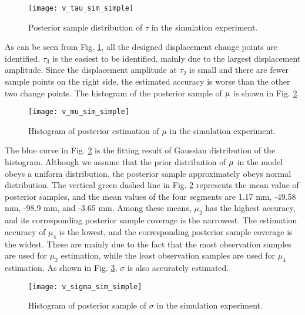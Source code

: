 \documentclass[final,3p,times]{elsarticle}
\begin{document}
	
	\begin{figure}[htbp]
		\centering
		\texttt{[image: v\_tau\_sim\_simple]}
		\caption{Posterior sample distribution of $\tau$ in the simulation experiment.}
		\label{fig_v_tau_sim_simple}
	\end{figure} 
	As can be seen from Fig. \ref{fig_v_tau_sim_simple}, all the designed displacement change points are identified. 
	$\tau_3$ is the easiest to be identified, mainly due to the largest displacement amplitude. 
	Since the displacement amplitude at $\tau_2$ is small and there are fewer sample points on the right side, the estimated accuracy is worse than the other two change points.
	The histogram of the posterior sample of $\bf{\mu}$ is shown in Fig. \ref{fig_v_mu_sim_simple}.
	
	\begin{figure}[htbp]
		\centering
		\texttt{[image: v\_mu\_sim\_simple]}
		\caption{Histogram of posterior estimation of $\mu$ in the simulation experiment.}
		\label{fig_v_mu_sim_simple}
	\end{figure} 
	The blue curve in Fig. \ref{fig_v_mu_sim_simple} is the fitting result of Gaussian distribution of the histogram.
	Although we assume that the prior distribution of $\bf{\mu}$ in the model obeys a uniform distribution, the posterior sample approximately obeys normal distribution. 
	The vertical green dashed line in Fig. \ref{fig_v_mu_sim_simple} represents the mean value of posterior samples, and the mean values of the four segments are 1.17 mm, -49.58 mm, -98.9 mm, and -3.65 mm.
	Among these means, $\mu_2$ has the highest accuracy, and its corresponding posterior sample coverage is the narrowest. 
	The estimation accuracy of $\mu_4$ is the lowest, and the corresponding posterior sample coverage is the widest. 
	These are mainly due to the fact that the most observation samples are used for $\mu_2$ estimation, while the least observation samples are used for $\mu_4$ estimation. 
	As shown in Fig. \ref{fig_v_sigma_sim_simple}, $\sigma$ is also accurately estimated.
	
	\begin{figure}[htbp]
		\centering
		\texttt{[image: v\_sigma\_sim\_simple]}
		\caption{Histogram of posterior sample of $\sigma$ in the simulation experiment.}
		\label{fig_v_sigma_sim_simple}
	\end{figure} 
\end{document}
